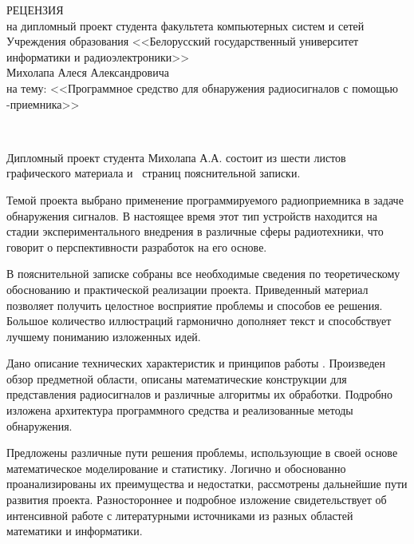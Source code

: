 \thispagestyle{empty}


{\small
  \begin{center}
    \begin{minipage}{0.9\textwidth}
      \begin{center}
        {\normalsize РЕЦЕНЗИЯ}\\[0.2cm]
        на дипломный проект студента факультета компьютерных систем и сетей Учреждения образования <<Белорусский государственный университет информатики и радиоэлектроники>>\\
        Михолапа Алеся Александровича \\
        на тему: <<Программное средство для обнаружения радиосигналов с помощью \SDR-приемника>>
      \end{center}
    \end{minipage}\\
  \end{center}

Дипломный проект студента Михолапа А.А. состоит из шести листов графического материала и~\pageref*{LastPage} страниц пояснительной записки.

Темой проекта выбрано применение программируемого радиоприемника в задаче обнаружения сигналов.
В настоящее время этот тип устройств находится на стадии экспериментального внедрения в различные сферы радиотехники, что говорит о перспективности разработок на его основе.

В пояснительной записке собраны все необходимые сведения по теоретическому обоснованию и практической реализации проекта.
Приведенный материал позволяет получить целостное восприятие проблемы и способов ее решения.
Большое количество иллюстраций гармонично дополняет текст и способствует лучшему пониманию изложенных идей.

Дано описание технических характеристик и принципов работы \sdr.
Произведен обзор предметной области, описаны математические конструкции для представления радиосигналов и различные алгоритмы их обработки.
Подробно изложена архитектура программного средства и реализованные методы обнаружения.

Предложены различные пути решения проблемы, использующие в своей основе математическое моделирование и статистику.
Логично и обоснованно проанализированы их преимущества и недостатки, рассмотрены дальнейшие пути развития проекта.
Разностороннее и подробное изложение свидетельствует об интенсивной работе с литературными источниками из разных областей математики и информатики.

}
